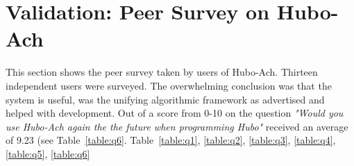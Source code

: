 \chapter{Validation: Peer Survey on Hubo-Ach}\label{sec:hubo-achSurvey}
	This section shows the peer survey taken by users of Hubo-Ach.
	Thirteen independent users were surveyed.
	The overwhelming conclusion was that the system is useful, was the unifying algorithmic framework as advertised and helped with development.
	Out of a score from 0-10 on the question \textit{"Would you use Hubo-Ach again the the future when programming Hubo"} received an average of 9.23 (see Table~\ref{table:q6}.
	Table~\ref{table:q1}, \ref{table:q2}, \ref{table:q3}, \ref{table:q4}, \ref{table:q5}, \ref{table:q6}

	
	
	
	
	
	